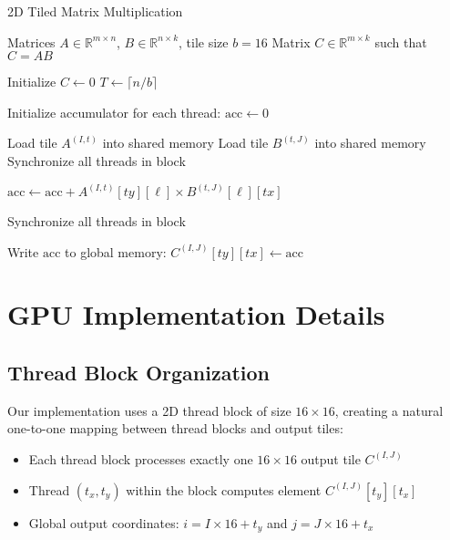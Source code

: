 \documentclass{amsbook}
\theoremstyle{definition}
\begin{document}
\begin{algorithm}
\caption{2D Tiled Matrix Multiplication}
\begin{algorithmic}[1]
\Require Matrices $A \in \mathbb{R}^{m \times n}$, $B \in \mathbb{R}^{n \times k}$, tile size $b = 16$
\Ensure Matrix $C \in \mathbb{R}^{m \times k}$ such that $C = AB$

\State Initialize $C \leftarrow 0$
\State $T \leftarrow \lceil n/b \rceil$ 

    \State Initialize accumulator for each thread: $\text{acc} \leftarrow 0$

     
        \State Load tile $A^{(I,t)}$ into shared memory 
        \State Load tile $B^{(t,J)}$ into shared memory 
        \State Synchronize all threads in block

         
            \State $\text{acc} \leftarrow \text{acc} + A^{(I,t)}[ty][\ell] \times B^{(t,J)}[\ell][tx]$
        \EndFor

        \State Synchronize all threads in block
    \EndFor

    \State Write $\text{acc}$ to global memory: $C^{(I,J)}[ty][tx] \leftarrow \text{acc}$
\EndFor
\end{algorithmic}
\end{algorithm}

\section{GPU Implementation Details}

\subsection{Thread Block Organization}

Our implementation uses a 2D thread block of size $16 \times 16$, creating a natural one-to-one mapping between thread blocks and output tiles:
\begin{itemize}
\item Each thread block processes exactly one $16 \times 16$ output tile $C^{(I,J)}$
\item Thread $(t_x, t_y)$ within the block computes element $C^{(I,J)}[t_y][t_x]$
\item Global output coordinates: $i = I \times 16 + t_y$ and $j = J \times 16 + t_x$
\end{itemize}
\end{document}
